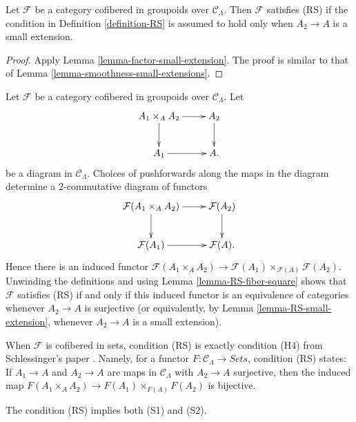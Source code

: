 \begin{lemma}
\label{lemma-RS-small-extension}
Let $\mathcal{F}$ be a category cofibered in groupoids over $\mathcal 
C_\Lambda$. Then $\mathcal{F}$ satisfies (RS) if the condition in 
Definition \ref{definition-RS} is assumed to hold only when $A_2 \to A$ 
is a small extension. 
\end{lemma}

\begin{proof}
Apply Lemma \ref{lemma-factor-small-extension}.  The proof is similar to that 
of Lemma \ref{lemma-smoothness-small-extensions}.
\end{proof}

\begin{remark}
\label{remark-RS-2-categorical}
Let $\mathcal{F}$ be a category cofibered in groupoids over $\mathcal 
C_\Lambda$.  Let
\[
\xymatrix{
A_1 \times_{A} A_2 \ar[r] \ar[d] & A_2 \ar[d] \\
A_1 \ar[r]     & A.   
}
\]
be a diagram in $\mathcal{C}_\Lambda$.  Choices of pushforwards along the maps 
in the diagram determine a $2$-commutative diagram of functors
\[
\xymatrix{
\mathcal{F}(A_1 \times_{A} A_2) \ar[r] \ar[d] & \mathcal{F}(A_2) \ar[d] \\
\mathcal{F}(A_1)                \ar[r]        & \mathcal{F}(A) .
}
\]
Hence there is an induced functor $\mathcal{F}(A_1 \times_{A} A_2) \to 
\mathcal{F}(A_1) \times_{\mathcal{F}(A)} \mathcal{F}(A_2)$.  Unwinding the 
definitions and using Lemma \ref{lemma-RS-fiber-square} shows that $\mathcal{F}$ 
satisfies (RS) if and only if this induced functor is an equivalence of 
categories whenever $A_2 \to A$ is surjective (or equivalently, by 
Lemma \ref{lemma-RS-small-extension}, whenever $A_2 \to A$ is a small 
extension).
\end{remark}

\begin{remark}
\label{remark-compare-schlessinger-H4}
When $\mathcal{F}$ is cofibered in sets, condition (RS) is exactly condition 
(H4) from Schlessinger's paper \cite[Theorem 2.11]{Sch}.  Namely, for 
a functor $F: \mathcal{C}_\Lambda \to \textit{Sets}$, condition 
(RS) states: If $A_1 \to A$ and $A_2 \to A$ are maps in 
$\mathcal{C}_\Lambda$ with $A_2 \to A$ surjective, then the induced 
map $F(A_1 \times_{A} A_2) \to F(A_1) \times_{F(A)} F(A_2)$ is 
bijective.
\end{remark}

\begin{lemma}
\label{lemma-RS-implies-S1-S2}
The condition (RS) implies both (S1) and (S2).
\end{lemma}

